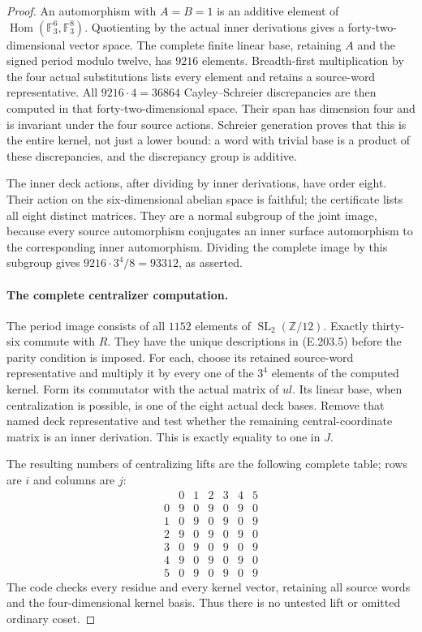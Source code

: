 \begin{proof}
An automorphism with $A=B=1$ is an additive element of
$\operatorname{Hom}(\mathbb F_3^6,\mathbb F_3^8)$.  Quotienting
by the actual inner derivations gives a forty-two-dimensional
vector space.  The complete finite linear base, retaining $A$
and the signed period modulo twelve, has $9216$ elements.
Breadth-first multiplication by the four actual substitutions
lists every element and retains a source-word representative.
All $9216\cdot4=36864$ Cayley--Schreier discrepancies are then
computed in that forty-two-dimensional space.  Their span has
dimension four and is invariant under the four source actions.
Schreier generation proves that this is the entire kernel, not
just a lower bound: a word with trivial base is a product of
these discrepancies, and the discrepancy group is additive.

The inner deck actions, after dividing by inner derivations,
have order eight.  Their action on the six-dimensional abelian
space is faithful; the certificate lists all eight distinct
matrices.  They are a normal subgroup of the joint image,
because every source automorphism conjugates an inner surface
automorphism to the corresponding inner automorphism.  Dividing
the complete image by this subgroup gives
$9216\cdot3^4/8=93312$, as asserted.

\paragraph{The complete centralizer computation.}
The period image consists of all $1152$ elements of
$\operatorname{SL}_2(\mathbb Z/12)$.  Exactly thirty-six
commute with $R$.  They have the unique descriptions in
(E.203.5) before the parity condition is imposed.  For each,
choose its retained source-word representative and multiply it
by every one of the $3^4$ elements of the computed kernel.
Form its commutator with the actual matrix of $ul$.  Its linear
base, when centralization is possible, is one of the eight
actual deck bases.  Remove that named deck representative and
test whether the remaining central-coordinate matrix is an
inner derivation.  This is exactly equality to one in $J$.

The resulting numbers of centralizing lifts are the following
complete table; rows are $i$ and columns are $j$:
\[
 \begin{array}{c|rrrrrr}
     &0&1&2&3&4&5\\\hline
 0&9&0&9&0&9&0\\
 1&0&9&0&9&0&9\\
 2&9&0&9&0&9&0\\
 3&0&9&0&9&0&9\\
 4&9&0&9&0&9&0\\
 5&0&9&0&9&0&9
 \end{array}                                                     \tag{E.203.9}
\]
The code checks every residue and every kernel vector, retaining
all source words and the four-dimensional kernel basis.  Thus
there is no untested lift or omitted ordinary coset.


\end{proof}
